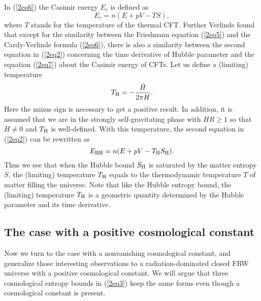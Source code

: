 \documentclass[a4paper,12pt]{article}
\begin{document}
In (\ref{2eq6}) the Casimir energy $E_c$ is defined as~\cite{Verl}
\begin{equation}
\label{2eq7}
 E_c=n(E +pV -TS),
 \end{equation}
 where $T$ stands for the temperature of the thermal CFT. Further
 Verlinde found that except for the similarity between the
 Friedmann equation (\ref{2eq5}) and the Cardy-Verlinde formula
 (\ref{2eq6}), there is also a similarity between the second
 equation in (\ref{2eq2}) concerning the time derivative of Hubble
 parameter and the equation (\ref{2eq7}) about the Casimir energy
 of CFTs. Let us define a (limiting) temperature
 \begin{equation}
 \label{2eq8}
 T_{\rm H}=-\frac{\dot H}{2\pi H}.
 \end{equation}
 Here the minus sign is necessary to get a positive result. In
 addition, it is assumed that we are in the strongly
 self-gravitating phase with $HR \ge 1$ so that $H\ne 0$ and 
 $T_{\rm H}$ is well-defined.  With this temperature, the second
 equation in (\ref{2eq2}) can be rewritten as
 \begin{equation}
 \label{2eq9}
 E_{\rm BH}=n(E+pV -T_{\rm H}S_{\rm H}).
 \end{equation}
 Thus we see that when the Hubble bound $S_{\rm H}$ is saturated by the
 matter entropy $S$, the (limiting) temperature $T_{\rm H}$ equals
 to the thermodynamic temperature $T$ of matter filling the
 universe. Note that like the Hubble entropy bound,  the (limiting) temperature
 $T_{\rm H}$ is a geometric quantity determined by the Hubble parameter 
and its time derivative.


\subsection{The case with a positive cosmological constant}


Now we turn to the case with a nonvanishing cosmological constant,
and generalize those interesting observations to a
radiation-dominated closed FRW universe with a positive
cosmological constant. We will argue that three cosmological entropy
bounds in (\ref{2eq3}) keep the same forms even though a cosmological 
constant is present.
\end{document}
